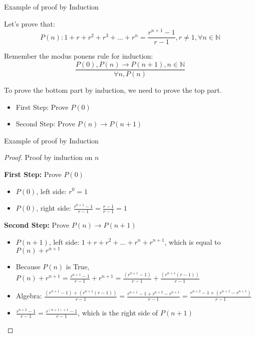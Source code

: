 \begin{frame}{Example of proof by Induction}

  Let's prove that:
  \begin{equation*}
    P(n): 1 + r + r^2 + r^3 + \ldots + r^n = \frac{r^{n+1}-1}{r-1}, r \neq 1, \forall n \in \mathbb{N}
  \end{equation*}\bigskip

  Remember the modus ponens rule for induction:
  \begin{equation*}
    \frac{P(0), P(n)\rightarrow P(n+1), n\in\mathbb{N}}{\forall n, P(n)}
  \end{equation*}\bigskip

  To prove the bottom part by induction, we need to prove the top part.

  \begin{itemize}
  \item First Step: Prove $P(0)$
  \item Second Step: Prove $P(n) \rightarrow P(n+1)$
  \end{itemize}
\end{frame}

\begin{frame}{Example of proof by Induction}

  \begin{proof}
    Proof by induction on $n$

    {\bf First Step:} Prove $P(0)$
    \begin{itemize}
    \item $P(0)$, left side: $r^0 = 1$
    \item $P(0)$, right side: $\frac{r^{0+1}-1}{r-1} = \frac{r-1}{r-1} = 1$
    \end{itemize}\medskip

    {\bf Second Step:} Prove $P(n) \rightarrow P(n+1)$
    \begin{itemize}
    \item $P(n+1)$, left side: $1 + r + r^2 + \ldots + r^n + r^{n+1}$, which is equal to $P(n)+r^{n+1}$
    \item Because $P(n)$ is True, $P(n)+r^{n+1} = \frac{r^{n+1}-1}{r-1} + r^{n+1} = \frac{(r^{n+1}-1)}{r-1} + \frac{(r^{n+1}(r-1))}{r-1}$
    \item Algebra: $\frac{(r^{n+1}-1) + (r^{n+1}(r-1))}{r-1} = \frac{r^{n+1} - 1 + r^{n+2} - r^{n+1}}{r-1} = \frac{r^{n+2} - 1 + (r^{n+1} - r^{n+1})}{r-1}$
    \item $\frac{r^{n+2} - 1}{r-1} = \frac{r^{(n+1)+1} - 1}{r-1}$, which is the right side of $P(n+1)$
    \end{itemize}
  \end{proof}
\end{frame}

